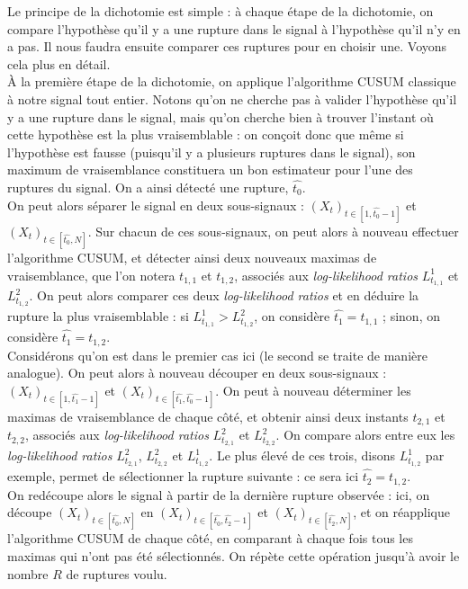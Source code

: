 \documentclass[french,11pt,notitlepage]{report}
\begin{document}
	 	Le principe de la dichotomie est simple : à chaque étape de la dichotomie, on compare l'hypothèse qu'il y a une rupture dans le signal à l'hypothèse qu'il n'y en a pas. Il nous faudra ensuite comparer ces ruptures pour en choisir une. Voyons cela plus en détail.
	 \\
	 
	 	À la première étape de la dichotomie, on applique l'algorithme CUSUM classique à notre signal tout entier. Notons qu'on ne cherche pas à valider l'hypothèse qu'il y a une rupture dans le signal, mais qu'on cherche bien à trouver l'instant où cette hypothèse est la plus vraisemblable : on conçoit donc que même si l'hypothèse est fausse (puisqu'il y a plusieurs ruptures dans le signal), son maximum de vraisemblance constituera un bon estimateur pour l'une des ruptures du signal. On a ainsi détecté une rupture, $\hat{t_0}$.
	 	\\
	 	
	 	On peut alors séparer le signal en deux sous-signaux : $(X_t)_{t \in [1, \hat{t_0}-1]}$ et $(X_t)_{t \in [\hat{t_0}, N]}$. Sur chacun de ces sous-signaux, on peut alors à nouveau effectuer l'algorithme CUSUM, et détecter ainsi deux nouveaux maximas de vraisemblance, que l'on notera $t_{1,1}$ et $t_{1,2}$, associés aux \textit{log-likelihood ratios} $L_{t_{1,1}}^1$ et $L_{t_{1,2}}^2$. On peut alors comparer ces deux \textit{log-likelihood ratios} et en déduire la rupture la plus vraisemblable : si $L_{t_{1,1}}^1 > L_{t_{1,2}}^2$, on considère $\hat{t_1} = t_{1,1}$ ; sinon, on considère $\hat{t_1} = t_{1,2}$.
	 	\\
	 	
	 	Considérons qu'on est dans le premier cas ici (le second se traite de manière analogue). On peut alors à nouveau découper en deux sous-signaux : $(X_t)_{t \in [1, \hat{t_1}-1]}$ et $(X_t)_{t \in [\hat{t_1}, \hat{t_0}-1]}$. On peut à nouveau déterminer les maximas de vraisemblance de chaque côté, et obtenir ainsi deux instants $t_{2,1}$ et $t_{2,2}$, associés aux \textit{log-likelihood ratios} $L_{t_{2,1}}^2$ et $L_{t_{2,2}}^2$. On compare alors entre eux les \textit{log-likelihood ratios} $L_{t_{2,1}}^2$, $L_{t_{2,2}}^2$ et $L_{t_{1,2}}^1$. Le plus élevé de ces trois, disons $L_{t_{1,2}}^1$ par exemple, permet de sélectionner la rupture suivante : ce sera ici $\hat{t_2} = t_{1,2}$.
	  \\
	 
	 	On redécoupe alors le signal à partir de la dernière rupture observée : ici, on découpe $(X_t)_{t \in [\hat{t_0}, N]}$ en $(X_t)_{t \in [\hat{t_0}, \hat{t_2}-1]}$ et $(X_t)_{t \in [\hat{t_2}, N]}$, et on réapplique l'algorithme CUSUM de chaque côté, en comparant à chaque fois tous les maximas qui n'ont pas été sélectionnés. On répète cette opération jusqu'à avoir le nombre $R$ de ruptures voulu.
\end{document}
